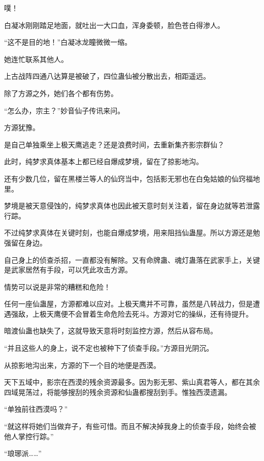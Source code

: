 \begin{this_body}
噗！

白凝冰刚刚踏足地面，就吐出一大口血，浑身委顿，脸色苍白得渗人。

“这不是目的地！”白凝冰龙瞳微微一缩。

她连忙联系其他人。

上古战阵四通八达算是被破了，四位蛊仙被分散出去，相距遥远。

除了方源之外，她们各个都有伤势。

“怎么办，宗主？”妙音仙子传讯来问。

方源犹豫。

是自己单独乘坐上极天鹰逃走？还是浪费时间，去重新集齐影宗群仙？

此时，纯梦求真体基本上都已经自爆成梦境，留在了掠影地沟。

还有少数几位，留在黑楼兰等人的仙窍当中，包括影无邪也在白兔姑娘的仙窍福地里。

梦境是被天意侵蚀的，纯梦求真体也因此被天意时刻关注着，留在身边就等若泄露行踪。

不过纯梦求真体在关键时刻，也能自爆成梦境，用来阻挡仙蛊屋。所以方源还是勉强留在身边。

自己身上的侦查杀招，一直都没有解除。又有命牌蛊、魂灯蛊落在武家手上，关键是武家居然有手段，可以凭此攻击方源。

情势可以说是非常的糟糕和危险！

任何一座仙蛊屋，方源都难以应对。上极天鹰并不可靠，虽然是八转战力，但是遭遇强敌，上极天鹰便不会冒着生命危险去死斗。方源对它的操纵，还有待提升。

暗渡仙蛊也缺失了，这就导致天意将时刻监控方源，然后从容布局。

“并且这些人的身上，说不定也被种下了侦查手段。”方源目光阴沉。

从掠影地沟出来，方源的下一个目的地便是西漠。

天下五域中，影宗在西漠的残余资源最多。因为影无邪、紫山真君等人，都在其余四域晃荡过，将能够搜刮的残余资源和仙蛊都搜刮到手。惟独西漠遗漏。

“单独前往西漠吗？”

“就这样将她们当做弃子，有些可惜。而且不解决掉我身上的侦查手段，始终会被他人掌控行踪。”

“琅琊派……”

\end{this_body}

